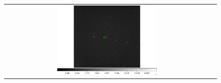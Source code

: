 \documentclass[letterpaper,12pt]{article}
\begin{document}
\begin{figure}[h!]
\begin{tabular}{cc}
                                                                                                                                                                                                                                                                                                                                                                                                                                                                                                                                                                                                                                                                                                                                                                                                                                                                                          \includegraphics[width=0.5\textwidth]{asteroid_23.png}

\end{tabular}
\end{figure}
\end{document}
